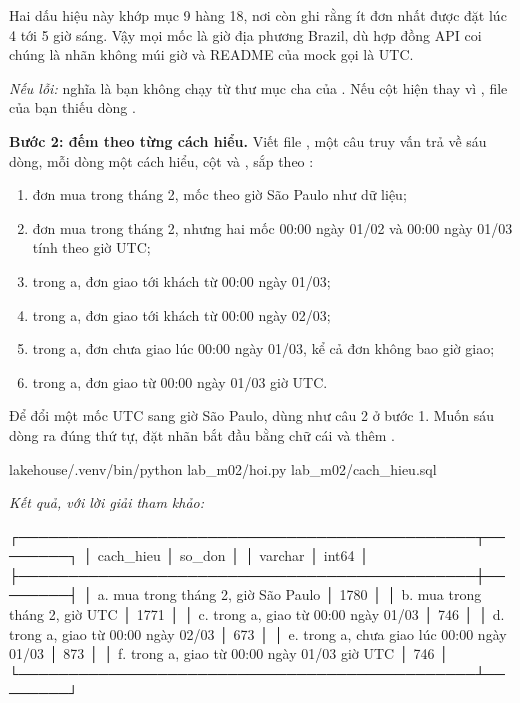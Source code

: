 Hai dấu hiệu này khớp  mục 9 hàng 18, nơi còn ghi rằng ít đơn nhất được đặt lúc 4 tới 5 giờ sáng. Vậy mọi mốc là giờ địa phương Brazil, dù hợp đồng API coi chúng là nhãn không múi giờ và README của mock gọi là UTC.

\textit{Nếu lỗi:}  nghĩa là bạn không chạy từ thư mục cha của . Nếu cột  hiện  thay vì , file  của bạn thiếu dòng .

\textbf{Bước 2: đếm theo từng cách hiểu.} Viết file , một câu truy vấn trả về sáu dòng, mỗi dòng một cách hiểu, cột  và , sắp theo :

\begin{enumerate}
  \item[a.] đơn mua trong tháng 2, mốc theo giờ São Paulo như dữ liệu;
  \item[b.] đơn mua trong tháng 2, nhưng hai mốc 00:00 ngày 01/02 và 00:00 ngày 01/03 tính theo giờ UTC;
  \item[c.] trong a, đơn giao tới khách từ 00:00 ngày 01/03;
  \item[d.] trong a, đơn giao tới khách từ 00:00 ngày 02/03;
  \item[e.] trong a, đơn chưa giao lúc 00:00 ngày 01/03, kể cả đơn không bao giờ giao;
  \item[f.] trong a, đơn giao từ 00:00 ngày 01/03 giờ UTC.
\end{enumerate}

Để đổi một mốc UTC sang giờ São Paulo, dùng  như câu 2 ở bước 1. Muốn sáu dòng ra đúng thứ tự, đặt nhãn bắt đầu bằng chữ cái và thêm .

\begin{codeblock}
lakehouse/.venv/bin/python lab_m02/hoi.py lab_m02/cach_hieu.sql
\end{codeblock}
\textit{Kết quả, với lời giải tham khảo:}
\begin{codeblock}
┌──────────────────────────────────────────────┬────────┐
│                  cach_hieu                   │ so_don │
│                   varchar                    │ int64  │
├──────────────────────────────────────────────┼────────┤
│ a. mua trong tháng 2, giờ São Paulo          │   1780 │
│ b. mua trong tháng 2, giờ UTC                │   1771 │
│ c. trong a, giao từ 00:00 ngày 01/03         │    746 │
│ d. trong a, giao từ 00:00 ngày 02/03         │    673 │
│ e. trong a, chưa giao lúc 00:00 ngày 01/03   │    873 │
│ f. trong a, giao từ 00:00 ngày 01/03 giờ UTC │    746 │
└──────────────────────────────────────────────┴────────┘
\end{codeblock}

